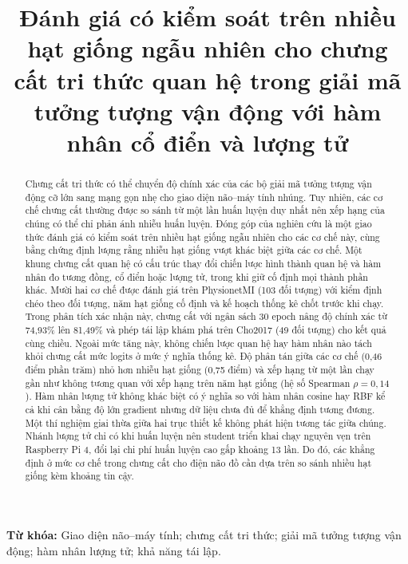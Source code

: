 \documentclass[11pt,a4paper]{article}
\title{Đánh giá có kiểm soát trên nhiều hạt giống ngẫu nhiên cho chưng cất tri thức quan hệ trong giải mã tưởng tượng vận động với hàm nhân cổ điển và lượng tử}
\author{}
\date{}
\begin{document}
\maketitle

\begin{abstract}
\noindent
Chưng cất tri thức có thể chuyển độ chính xác của các bộ giải mã tưởng
tượng vận động cỡ lớn sang mạng gọn nhẹ cho giao diện não--máy tính nhúng.
Tuy nhiên, các cơ chế chưng cất thường được so sánh từ một lần huấn luyện
duy nhất nên xếp hạng của chúng có thể chỉ phản ánh nhiễu huấn luyện. Đóng
góp của nghiên cứu là một giao thức đánh giá có kiểm soát trên nhiều hạt
giống ngẫu nhiên cho các cơ chế này, cùng bằng chứng định lượng rằng nhiễu
hạt giống vượt khác biệt giữa các cơ chế. Một khung chưng cất quan hệ có
cấu trúc thay đổi chiến lược hình thành quan hệ và hàm nhân đo tương đồng,
cổ điển hoặc lượng tử, trong khi giữ cố định mọi thành phần khác. Mười hai
cơ chế được đánh giá trên PhysionetMI (103 đối tượng) với kiểm định chéo
theo đối tượng, năm hạt giống cố định và kế hoạch thống kê chốt trước khi
chạy. Trong phân tích xác nhận này, chưng cất với ngân sách 30 epoch nâng
độ chính xác từ 74,93\% lên 81,49\% và phép tái lập khám phá trên Cho2017
(49 đối tượng) cho kết quả cùng chiều. Ngoài mức tăng này, không chiến lược
quan hệ hay hàm nhân nào tách khỏi chưng cất mức logits ở mức ý nghĩa thống
kê. Độ phân tán giữa các cơ chế (0,46 điểm phần trăm) nhỏ hơn nhiễu hạt
giống (0,75 điểm) và xếp hạng từ một lần chạy gần như không tương quan với
xếp hạng trên năm hạt giống (hệ số Spearman $\rho = 0{,}14$). Hàm nhân lượng
tử không khác biệt có ý nghĩa so với hàm nhân cosine hay RBF kể cả khi cân
bằng độ lớn gradient nhưng dữ liệu chưa đủ để khẳng định tương đương.
Một thí nghiệm giai thừa giữa hai trục thiết kế không phát hiện tương tác
giữa chúng. Nhánh lượng tử chỉ có khi huấn luyện nên student triển khai chạy
nguyên vẹn trên Raspberry Pi 4, đổi lại chi phí huấn luyện cao gấp khoảng 13
lần. Do đó, các khẳng định ở mức cơ chế trong chưng cất cho điện não đồ cần
dựa trên so sánh nhiều hạt giống kèm khoảng tin cậy.
\end{abstract}

\noindent\textbf{Từ khóa:} Giao diện não--máy tính; chưng cất tri thức; giải mã tưởng tượng vận động; hàm nhân lượng tử; khả năng tái lập.



\renewcommand{\refname}{Tài liệu tham khảo}

\end{document}
